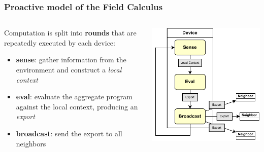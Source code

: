 \begin{frame}
    \frametitle{Proactive model of the Field Calculus}
    \begin{columns}
        \begin{column}{0.4\textwidth}
            Computation is split into \textbf{rounds} that are repeatedly executed by each device:
            \begin{itemize}
                \item \textbf{sense}: gather information from the environment and construct a \textit{local context}
                \item \textbf{eval}: evaluate the aggregate program against the local context, producing an \textit{export}
                \item \textbf{broadcast}: send the export to all neighbors
            \end{itemize}
        \end{column}
        \begin{column}{0.6\textwidth}
            \includegraphics[width=\textwidth]{figures/proactive-model.pdf}
        \end{column}
    \end{columns}
\end{frame}

